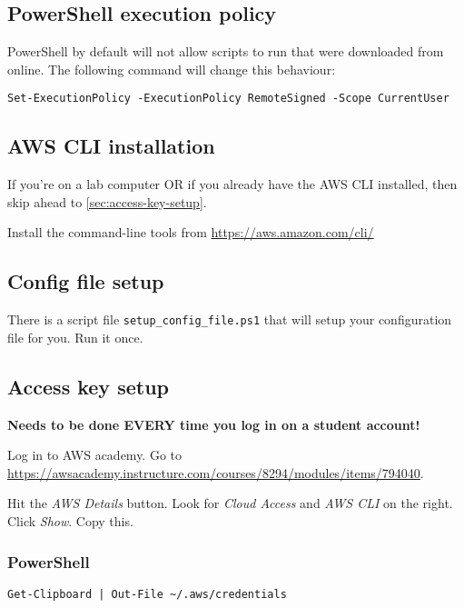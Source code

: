 \documentclass{pgnotes}
\begin{document}
\subsection{PowerShell execution policy}

PowerShell by default will not allow scripts to run that were downloaded from online.
The following command will change this behaviour: 
\begin{verbatim}
Set-ExecutionPolicy -ExecutionPolicy RemoteSigned -Scope CurrentUser
\end{verbatim}

\subsection{AWS CLI installation}

If you're on a lab computer OR if you already have the AWS CLI installed, then skip ahead to \autoref{sec:access-key-setup}.

Install the command-line tools from \url{https://aws.amazon.com/cli/}

\subsection{Config file setup}
\label{sec:config-file-setup}

There is a script file \texttt{setup\_config\_file.ps1} that will setup your configuration file for you.
Run it once.

\subsection{Access key setup}
\label{sec:access-key-setup}

\textbf{Needs to be done EVERY time you log in on a student account!}

Log in to AWS academy.
Go to \url{https://awsacademy.instructure.com/courses/8294/modules/items/794040}.

Hit the \textit{AWS Details} button.
Look for \textit{Cloud Access} and \textit{AWS CLI} on the right.
Click \textit{Show}.
Copy this.

\subsubsection{PowerShell}

\begin{verbatim}
Get-Clipboard | Out-File ~/.aws/credentials
\end{verbatim}
\end{document}
